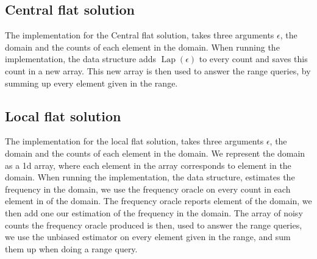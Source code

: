 \documentclass[11pt]{article}
\theoremstyle{definition}
\begin{document}
\subsection{Central flat solution}
The implementation for the Central flat solution, takes three arguments $\epsilon$, the domain and the counts of each element in the domain. 
When running the implementation, the data structure adds $\operatorname{Lap}(\epsilon)$ to every count and saves this count in a new array. This new array is then used to answer the range queries, by summing up every element given in the range.

\subsection{Local flat solution}
The implementation for the local flat solution, takes three arguments $\epsilon$, the domain and the counts of each element in the domain. We represent the domain as a 1d array, where each element in the array corresponds to element in the domain. When running the implementation, the data structure, estimates the frequency in the domain, we use the frequency oracle on every count in each element in of the domain. The frequency oracle reports element of the domain, we then add one our estimation of the frequency in the domain. The array of noisy counts the frequency oracle produced is then, used to answer the range queries, we use the unbiased estimator on every element given in the range, and sum them up when doing a range query. 
\end{document}
